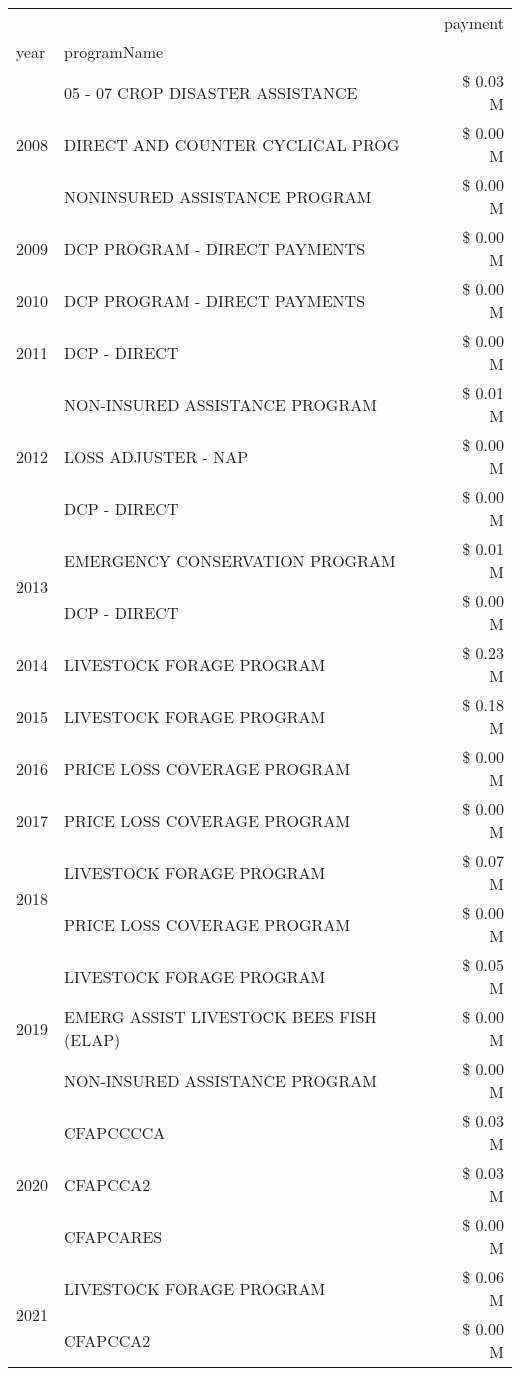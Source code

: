 \begin{tabular}{llr}
\toprule
 &  & payment \\
year & programName &  \\
\midrule
\multirow[t]{3}{*}{2008} & 05 - 07 CROP DISASTER ASSISTANCE & \$ 0.03 M \\
 & DIRECT AND COUNTER CYCLICAL PROG & \$ 0.00 M \\
 & NONINSURED ASSISTANCE PROGRAM & \$ 0.00 M \\
\cline{1-3}
2009 & DCP PROGRAM - DIRECT PAYMENTS & \$ 0.00 M \\
\cline{1-3}
2010 & DCP PROGRAM - DIRECT PAYMENTS & \$ 0.00 M \\
\cline{1-3}
2011 & DCP - DIRECT & \$ 0.00 M \\
\cline{1-3}
\multirow[t]{3}{*}{2012} & NON-INSURED ASSISTANCE PROGRAM & \$ 0.01 M \\
 & LOSS ADJUSTER - NAP & \$ 0.00 M \\
 & DCP - DIRECT & \$ 0.00 M \\
\cline{1-3}
\multirow[t]{2}{*}{2013} & EMERGENCY CONSERVATION PROGRAM & \$ 0.01 M \\
 & DCP - DIRECT & \$ 0.00 M \\
\cline{1-3}
2014 & LIVESTOCK FORAGE PROGRAM & \$ 0.23 M \\
\cline{1-3}
2015 & LIVESTOCK FORAGE PROGRAM & \$ 0.18 M \\
\cline{1-3}
2016 & PRICE LOSS COVERAGE PROGRAM                   & \$ 0.00 M \\
\cline{1-3}
2017 & PRICE LOSS COVERAGE PROGRAM & \$ 0.00 M \\
\cline{1-3}
\multirow[t]{2}{*}{2018} & LIVESTOCK FORAGE PROGRAM & \$ 0.07 M \\
 & PRICE LOSS COVERAGE PROGRAM & \$ 0.00 M \\
\cline{1-3}
\multirow[t]{3}{*}{2019} & LIVESTOCK FORAGE PROGRAM & \$ 0.05 M \\
 & EMERG ASSIST LIVESTOCK BEES FISH (ELAP) & \$ 0.00 M \\
 & NON-INSURED ASSISTANCE PROGRAM & \$ 0.00 M \\
\cline{1-3}
\multirow[t]{3}{*}{2020} & CFAPCCCCA & \$ 0.03 M \\
 & CFAPCCA2 & \$ 0.03 M \\
 & CFAPCARES & \$ 0.00 M \\
\cline{1-3}
\multirow[t]{2}{*}{2021} & LIVESTOCK FORAGE PROGRAM & \$ 0.06 M \\
 & CFAPCCA2 & \$ 0.00 M \\
\cline{1-3}
\bottomrule
\end{tabular}
